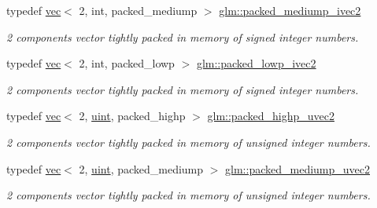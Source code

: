 \begin{DoxyCompactItemize}
\mbox{\label{group__gtc__type__aligned_ga42af0b51e654d83bd9201e96308942b5}} 
typedef \hyperlink{structglm_1_1vec}{vec}$<$ 2, int, packed\+\_\+mediump $>$ \hyperlink{group__gtc__type__aligned_ga42af0b51e654d83bd9201e96308942b5}{glm\+::packed\+\_\+mediump\+\_\+ivec2}
\begin{DoxyCompactList}\small\item\em 2 components vector tightly packed in memory of signed integer numbers. \end{DoxyCompactList}\item 
\mbox{\label{group__gtc__type__aligned_gabd82de5d7aef1f8373fe14cd05ce617c}} 
typedef \hyperlink{structglm_1_1vec}{vec}$<$ 2, int, packed\+\_\+lowp $>$ \hyperlink{group__gtc__type__aligned_gabd82de5d7aef1f8373fe14cd05ce617c}{glm\+::packed\+\_\+lowp\+\_\+ivec2}
\begin{DoxyCompactList}\small\item\em 2 components vector tightly packed in memory of signed integer numbers. \end{DoxyCompactList}\item 
\mbox{\label{group__gtc__type__aligned_gafd17d664314ead069de290b1d5137c47}} 
typedef \hyperlink{structglm_1_1vec}{vec}$<$ 2, \hyperlink{group__core__precision_ga4fd29415871152bfb5abd588334147c8}{uint}, packed\+\_\+highp $>$ \hyperlink{group__gtc__type__aligned_gafd17d664314ead069de290b1d5137c47}{glm\+::packed\+\_\+highp\+\_\+uvec2}
\begin{DoxyCompactList}\small\item\em 2 components vector tightly packed in memory of unsigned integer numbers. \end{DoxyCompactList}\item 
\mbox{\label{group__gtc__type__aligned_ga18dd6e7cd05a4239428b2a0751d48d4a}} 
typedef \hyperlink{structglm_1_1vec}{vec}$<$ 2, \hyperlink{group__core__precision_ga4fd29415871152bfb5abd588334147c8}{uint}, packed\+\_\+mediump $>$ \hyperlink{group__gtc__type__aligned_ga18dd6e7cd05a4239428b2a0751d48d4a}{glm\+::packed\+\_\+mediump\+\_\+uvec2}
\begin{DoxyCompactList}\small\item\em 2 components vector tightly packed in memory of unsigned integer numbers. \end{DoxyCompactList}\item 

\end{DoxyCompactItemize}
